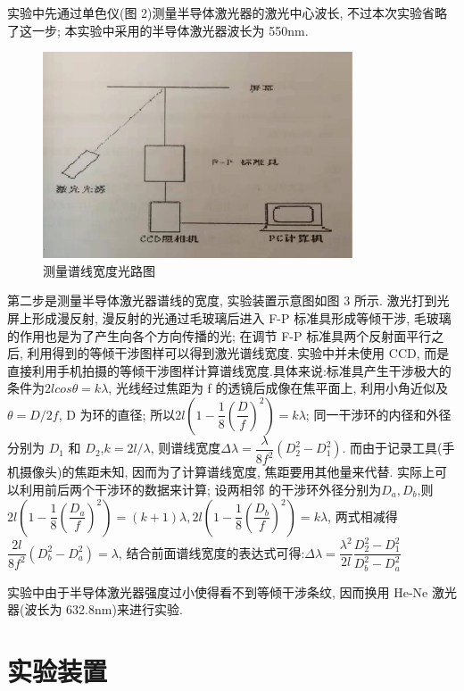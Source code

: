 \documentclass[aps,pre,12pt,preprint,%
	onecolumn,showpacs,showkeys,nofootinbib]{revtex4-2}
\begin{document}
\par 实验中先通过单色仪(图 2)测量半导体激光器的激光中心波长, 不过本次实验省略了这一步; 本实验中采用的半导体激光器波长为 550nm.
\begin{figure}[!h]
    	\centering
    	\includegraphics[width=.7\linewidth]{img/3.png}
    	\caption[测量谱线宽度光路图]{测量谱线宽度光路图}\vspace{1ex}
    	\end{figure}   
\par 第二步是测量半导体激光器谱线的宽度, 实验装置示意图如图 3 所示. 激光打到光屏上形成漫反射, 漫反射的光通过毛玻璃后进入 F-P 标准具形成等倾干涉, 毛玻璃的作用也是为了产生向各个方向传播的光; 在调节 F-P 标准具两个反射面平行之后, 利用得到的等倾干涉图样可以得到激光谱线宽度. 实验中并未使用 CCD, 而是直接利用手机拍摄的等倾干涉图样计算谱线宽度.具体来说:标准具产生干涉极大的条件为$2lcos\theta=k\lambda$, 光线经过焦距为 f 的透镜后成像在焦平面上, 利用小角近似及$\theta=D/2f$, D 为环的直径; 所以$2l(1-\dfrac{1}{8}(\dfrac{D}{f})^2)=k\lambda$; 同一干涉环的内径和外径分别为 $D_1$ 和 $D_2$,$k=2l/\lambda$, 则谱线宽度$\Delta\lambda=\dfrac{\lambda}{8f^2}(D_2^2-D_1^2)$. 而由于记录工具(手机摄像头)的焦距未知, 因而为了计算谱线宽度, 焦距要用其他量来代替. 实际上可以利用前后两个干涉环的数据来计算; 设两相邻
的干涉环外径分别为$D_a,D_b$,则$2l(1-\dfrac{1}{8}(\dfrac{D_a}{f})^2)=(k+1)\lambda,2l(1-\dfrac{1}{8}(\dfrac{D_b}{f})^2)=k\lambda$, 两式相减得$\dfrac{2l}{8f^2}(D_b^2-D_a^2)=\lambda$, 结合前面谱线宽度的表达式可得:$\Delta\lambda=\dfrac{\lambda^2}{2l}\dfrac{D_2^2-D_1^2}{D_b^2-D_a^2}$
\par 实验中由于半导体激光器强度过小使得看不到等倾干涉条纹, 因而换用 He-Ne 激光器(波长为 632.8nm)来进行实验.
\section{实验装置}
\end{document}
